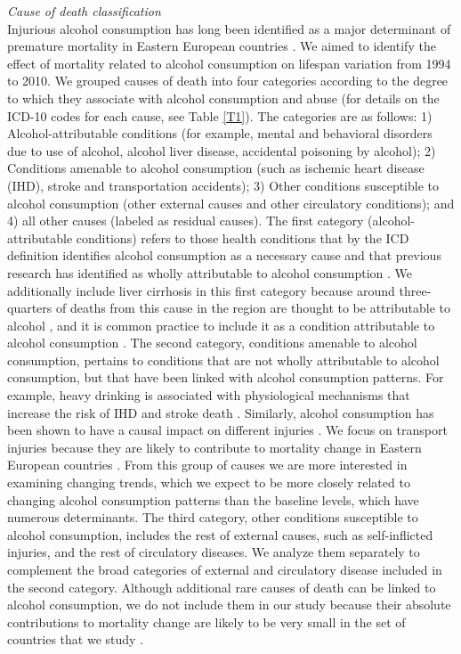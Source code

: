 \documentclass{article}
\begin{document}
\begin{spacing}{1.5}
\emph{Cause of death classification}\\
Injurious alcohol consumption has long been identified as a major determinant of premature mortality in Eastern European countries \citep{leon1997huge,mckee2001,rehm2007,grigoriev2015}. We aimed to identify the effect of mortality related to alcohol consumption on lifespan variation from 1994 to 2010. 
We grouped causes of death into four categories according to the degree to which they associate with alcohol consumption and abuse (for details on the ICD-10 codes for each cause, see Table \ref{T1}). The categories are as follows:
1) Alcohol-attributable conditions (for example, mental and behavioral disorders due to use of alcohol, alcohol liver disease, accidental poisoning by alcohol); 2) Conditions amenable to alcohol consumption (such as ischemic heart disease (IHD), stroke and transportation accidents); 3) Other conditions susceptible to alcohol consumption (other external causes and other circulatory conditions); and 4) all other causes (labeled as residual causes). 
The first category (alcohol-attributable conditions) refers to those health conditions that by the ICD definition identifies alcohol consumption as a necessary cause and that previous research has identified as wholly attributable to alcohol consumption \citep{rehm2010relation}. We additionally include liver cirrhosis in this first category because around three-quarters of deaths from this cause in the region are thought to be attributable to alcohol \citep{rehm2003relationship}, and it is common practice to include it as a condition attributable to alcohol consumption \citep{rehm2003relationship,rehm2010relation}. 
The second category, conditions amenable to alcohol consumption, pertains to conditions that are not wholly attributable to alcohol consumption, but that have been linked with alcohol consumption patterns. For example, heavy drinking is associated with physiological mechanisms that increase the risk of IHD and stroke death \citep{rehm2010relation}.  Similarly, alcohol consumption has been shown to have a causal impact on different injuries \citep{rehm2003relationship}. We focus on transport injuries because they are likely to contribute to mortality change in Eastern European countries \citep{grigoriev2015}. From this group of causes we are more interested in examining changing trends, which we expect to be more closely related to changing alcohol consumption patterns than the baseline levels, which have numerous determinants. 
The third category, other conditions susceptible to alcohol consumption, includes the rest of external causes, such as self-inflicted injuries, and the rest of circulatory diseases. We analyze them separately to complement the broad categories of external and circulatory disease included in the second category. Although additional rare causes of death can be linked to alcohol consumption, we do not include them in our study because their absolute contributions to mortality change are likely to be very small in the set of countries that we study \citep{grigoriev2015}.



\end{spacing}
\end{document}
